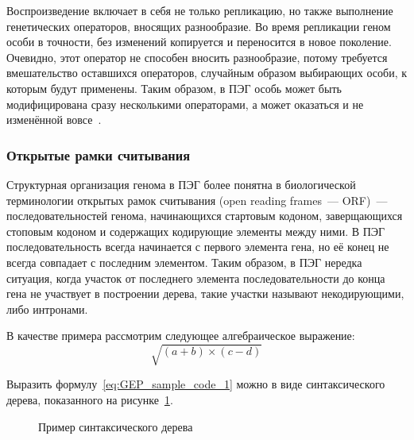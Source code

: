 Воспроизведение включает в себя не только репликацию, но также выполнение генетических операторов, вносящих разнообразие. Во время репликации геном особи в точности, без изменений копируется и переносится в новое поколение. Очевидно, этот оператор не способен вносить разнообразие, потому требуется вмешательство оставшихся операторов, случайным образом выбирающих особи, к которым будут применены. Таким образом, в ПЭГ особь может быть модифицирована сразу несколькими операторами, а может оказаться и не изменённой вовсе~\cite{ferreira:2001:wsc6Aa}.


\subsubsection{Открытые рамки считывания}

Структурная организация генома в ПЭГ более понятна в биологической терминологии открытых рамок считывания (open reading frames~--- ORF)~--- последовательностей генома, начинающихся стартовым кодоном, заверщающихся стоповым кодоном и содержащих кодирующие элементы между ними. В ПЭГ последовательность всегда начинается с первого элемента гена, но её конец не всегда совпадает с последним элементом. Таким образом, в ПЭГ нередка ситуация, когда участок от последнего элемента последовательности до конца гена не участвует в построении дерева, такие участки называют некодирующими, либо интронами.

В качестве примера рассмотрим следующее алгебраическое выражение:
\begin{equation}
\label{eq:GEP_sample_code_1}
\sqrt{(a+b)\times(c-d)}
\end{equation}

Выразить формулу~\eqref{eq:GEP_sample_code_1} можно в виде синтаксического дерева, показанного на рисунке~\ref{img:GEP_ET_sample_1}.
\begin{figure} [h]
  \center
  \caption{Пример синтаксического дерева}
  \label{img:GEP_ET_sample_1}
\end{figure}

